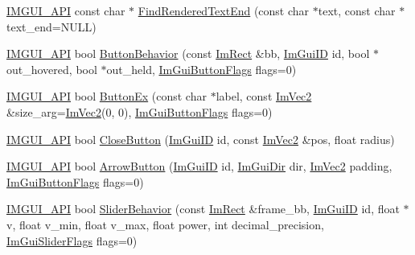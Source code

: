 \begin{DoxyCompactItemize}
\item 
\mbox{\hyperlink{imgui_8h_a43829975e84e45d1149597467a14bbf5}{I\+M\+G\+U\+I\+\_\+\+A\+PI}} const char $\ast$ \mbox{\hyperlink{namespace_im_gui_a7671e1dbc803a31b06081b52a771d83f}{Find\+Rendered\+Text\+End}} (const char $\ast$text, const char $\ast$text\+\_\+end=N\+U\+LL)
\item 
\mbox{\hyperlink{imgui_8h_a43829975e84e45d1149597467a14bbf5}{I\+M\+G\+U\+I\+\_\+\+A\+PI}} bool \mbox{\hyperlink{namespace_im_gui_a65a4f18b1bc8ce0f351687922089f374}{Button\+Behavior}} (const \mbox{\hyperlink{struct_im_rect}{Im\+Rect}} \&bb, \mbox{\hyperlink{imgui_8h_a1785c9b6f4e16406764a85f32582236f}{Im\+Gui\+ID}} id, bool $\ast$out\+\_\+hovered, bool $\ast$out\+\_\+held, \mbox{\hyperlink{imgui__internal_8h_a990fae518aa1d95f571ee40989de4c22}{Im\+Gui\+Button\+Flags}} flags=0)
\item 
\mbox{\hyperlink{imgui_8h_a43829975e84e45d1149597467a14bbf5}{I\+M\+G\+U\+I\+\_\+\+A\+PI}} bool \mbox{\hyperlink{namespace_im_gui_ae479220c66b039874c6e4c9e9b22849f}{Button\+Ex}} (const char $\ast$label, const \mbox{\hyperlink{struct_im_vec2}{Im\+Vec2}} \&size\+\_\+arg=\mbox{\hyperlink{struct_im_vec2}{Im\+Vec2}}(0, 0), \mbox{\hyperlink{imgui__internal_8h_a990fae518aa1d95f571ee40989de4c22}{Im\+Gui\+Button\+Flags}} flags=0)
\item 
\mbox{\hyperlink{imgui_8h_a43829975e84e45d1149597467a14bbf5}{I\+M\+G\+U\+I\+\_\+\+A\+PI}} bool \mbox{\hyperlink{namespace_im_gui_a5e8e4df6418dcda3c4c5d15ecdf7d968}{Close\+Button}} (\mbox{\hyperlink{imgui_8h_a1785c9b6f4e16406764a85f32582236f}{Im\+Gui\+ID}} id, const \mbox{\hyperlink{struct_im_vec2}{Im\+Vec2}} \&pos, float radius)
\item 
\mbox{\hyperlink{imgui_8h_a43829975e84e45d1149597467a14bbf5}{I\+M\+G\+U\+I\+\_\+\+A\+PI}} bool \mbox{\hyperlink{namespace_im_gui_ac7c2bd67d2bb2d8ee4b583b1576a0bd3}{Arrow\+Button}} (\mbox{\hyperlink{imgui_8h_a1785c9b6f4e16406764a85f32582236f}{Im\+Gui\+ID}} id, \mbox{\hyperlink{imgui__internal_8h_a4b8427c5153ae1d43278dc397d809335}{Im\+Gui\+Dir}} dir, \mbox{\hyperlink{struct_im_vec2}{Im\+Vec2}} padding, \mbox{\hyperlink{imgui__internal_8h_a990fae518aa1d95f571ee40989de4c22}{Im\+Gui\+Button\+Flags}} flags=0)
\item 
\mbox{\hyperlink{imgui_8h_a43829975e84e45d1149597467a14bbf5}{I\+M\+G\+U\+I\+\_\+\+A\+PI}} bool \mbox{\hyperlink{namespace_im_gui_a3d3b2964eeba76dadaa532232c23fc97}{Slider\+Behavior}} (const \mbox{\hyperlink{struct_im_rect}{Im\+Rect}} \&frame\+\_\+bb, \mbox{\hyperlink{imgui_8h_a1785c9b6f4e16406764a85f32582236f}{Im\+Gui\+ID}} id, float $\ast$v, float v\+\_\+min, float v\+\_\+max, float power, int decimal\+\_\+precision, \mbox{\hyperlink{imgui__internal_8h_a50cc3e3e4beb155e2186f8c1dc057e18}{Im\+Gui\+Slider\+Flags}} flags=0)

\end{DoxyCompactItemize}
